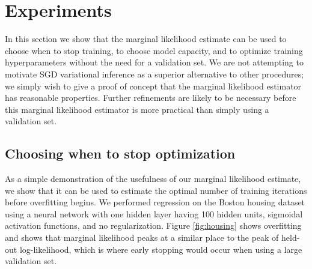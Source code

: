 \documentclass[]{article}
\begin{document}
\section{Experiments}
\label{sec:experiments}

In this section we show that the marginal likelihood estimate can be used to choose when to stop training, to choose model capacity, and to optimize training hyperparameters without the need for a validation set.
We are not attempting to motivate SGD variational inference as a superior alternative to other procedures;
we simply wish to give a proof of concept that the marginal likelihood estimator has reasonable properties.
Further refinements are likely to be necessary before this marginal likelihood estimator is more practical than simply using a validation set.

\subsection{Choosing when to stop optimization}

As a simple demonstration of the usefulness of our marginal likelihood estimate, we show that it can be used to estimate the optimal number of training iterations before overfitting begins.
We performed regression on the Boston housing dataset 
using a neural network with one hidden layer having 100 hidden units, sigmoidal activation functions, and no regularization.
Figure \ref{fig:housing} shows overfitting and shows that marginal likelihood peaks at a similar place to the peak of held-out log-likelihood, which is where early stopping would occur when using a large validation set.
\end{document}

